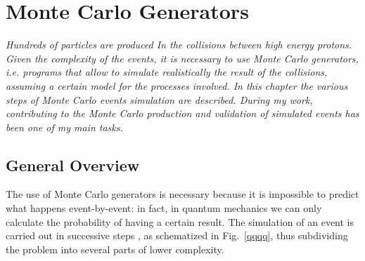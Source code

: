 \chapter{Monte Carlo Generators}
\label{cap3}


\textit{Hundreds of particles are produced In the collisions between high energy protons.
Given the complexity of the events, it is necessary to use Monte Carlo generators, i.e. programs that allow to simulate realistically the result of the collisions, assuming a certain model for the processes involved. In this chapter the various steps of Monte Carlo events simulation are described. During my work, contributing to the Monte Carlo production and validation of simulated events has been one of my main tasks.}

\section{General Overview}
The use of Monte Carlo generators is necessary because it is impossible to predict what happens event-by-event: in fact,  in quantum mechanics we can only calculate the probability of having a certain result.
The simulation of an event is carried out in successive steps \cite{Sjostrand:2006su, Buckley:2011ms}, as schematized in Fig.~\ref{qqqq}, thus subdividing the problem into several parts of lower complexity.


